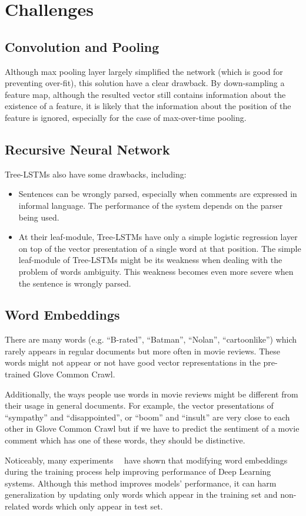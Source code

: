 \section{Challenges}
\subsection{Convolution and Pooling}\label{sec:cnn-weak}
Although max pooling layer largely simplified the network (which is good for preventing over-fit), this solution have a clear drawback.
By down-sampling a feature map, although the resulted vector still contains information about the existence of a feature, it is likely that the information about the position of the feature is ignored, especially for the case of max-over-time pooling.
\subsection{Recursive Neural Network}\label{sec:recursive-nn-weak}
Tree-LSTMs also have some drawbacks, including:
\begin{itemize}
	\item Sentences can be wrongly parsed, especially when comments are expressed in informal language.
	The performance of the system depends on the parser being used.
	\item At their leaf-module, Tree-LSTMs have only a simple logistic regression layer on top of the vector presentation of a single word at that position.
	The simple leaf-module of Tree-LSTMs might be its weakness when dealing with the problem of words ambiguity.
	This weakness becomes even more severe when the sentence is wrongly parsed. 
\end{itemize}
\subsection{Word Embeddings}\label{sec:word-weak}
There are many words (e.g. ``B-rated'', ``Batman'', ``Nolan'', ``cartoonlike'') which rarely appears in regular documents but more often in movie reviews.
These words might not appear or not have good vector representations in the pre-trained Glove Common Crawl.

Additionally, the ways people use words in movie reviews might be different from their usage in general documents.
For example, the vector presentations of ``sympathy'' and ``disappointed'', or ``boom'' and ``insult'' are very close to each other in Glove Common Crawl but if we have to predict the sentiment of a movie comment which has one of these words, they should be distinctive.

Noticeably, many experiments~\cite{treeLSTM}~\cite{KimCNN} have shown that modifying word embeddings during the training process help improving performance of Deep Learning systems.
Although this method improves models' performance, it can harm generalization by updating only words which appear in the training set and non-related words which only appear in test set.